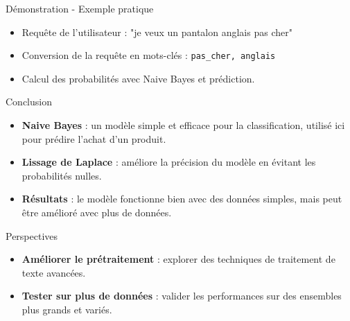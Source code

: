 \documentclass{beamer}
\begin{document}
\begin{frame}{Démonstration - Exemple pratique}
    \begin{itemize}
        \item Requête de l'utilisateur : "je veux un pantalon anglais pas cher"
        \item Conversion de la requête en mots-clés : \texttt{pas\_cher, anglais}
        \item Calcul des probabilités avec Naive Bayes et prédiction.
    \end{itemize}
\end{frame}

\begin{frame}{Conclusion}
    \begin{itemize}
        \item \textbf{Naive Bayes} : un modèle simple et efficace pour la classification, utilisé ici pour prédire l'achat d'un produit.
        \item \textbf{Lissage de Laplace} : améliore la précision du modèle en évitant les probabilités nulles.
        \item \textbf{Résultats} : le modèle fonctionne bien avec des données simples, mais peut être amélioré avec plus de données.
    \end{itemize}
    
    \vspace{1em}
    \begin{block}{Perspectives}
        \begin{itemize}
            \item \textbf{Améliorer le prétraitement} : explorer des techniques de traitement de texte avancées.
            \item \textbf{Tester sur plus de données} : valider les performances sur des ensembles plus grands et variés.
        \end{itemize}
    \end{block}
\end{frame}
\end{document}
